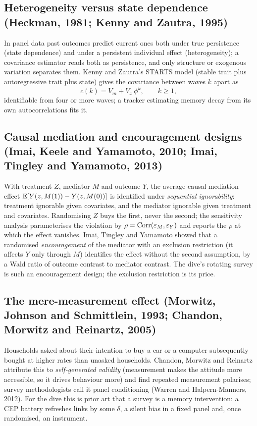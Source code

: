 \subsection{Heterogeneity versus state dependence (Heckman, 1981; Kenny and Zautra, 1995)}

In panel data past outcomes predict current ones both under true persistence (state dependence) and under a persistent individual effect (heterogeneity); a covariance estimator reads both as persistence, and only structure or exogenous variation separates them. Kenny and Zautra's STARTS model (stable trait plus autoregressive trait plus state) gives the covariance between waves $k$ apart as
\begin{equation}
c(k) = V_m + V_x\,\phi^{k}, \qquad k \ge 1,
\label{panel:eq:starts}
\end{equation}
identifiable from four or more waves; a tracker estimating memory decay from its own autocorrelations fits it.

\subsection{Causal mediation and encouragement designs (Imai, Keele and Yamamoto, 2010; Imai, Tingley and Yamamoto, 2013)}

With treatment $Z$, mediator $M$ and outcome $Y$, the average causal mediation effect $\mathbb{E}[Y(z, M(1)) - Y(z, M(0))]$ is identified under \emph{sequential ignorability}: treatment ignorable given covariates, and the mediator ignorable given treatment and covariates. Randomising $Z$ buys the first, never the second; the sensitivity analysis parameterises the violation by $\rho = \operatorname{Corr}(\varepsilon_M, \varepsilon_Y)$ and reports the $\rho$ at which the effect vanishes. Imai, Tingley and Yamamoto showed that a randomised \emph{encouragement} of the mediator with an exclusion restriction (it affects $Y$ only through $M$) identifies the effect without the second assumption, by a Wald ratio of outcome contrast to mediator contrast. The dive's rotating survey is such an encouragement design; the exclusion restriction is its price.

\subsection{The mere-measurement effect (Morwitz, Johnson and Schmittlein, 1993; Chandon, Morwitz and Reinartz, 2005)}

Households asked about their intention to buy a car or a computer subsequently bought at higher rates than unasked households. Chandon, Morwitz and Reinartz attribute this to \emph{self-generated validity} (measurement makes the attitude more accessible, so it drives behaviour more) and find repeated measurement polarises; survey methodologists call it panel conditioning (Warren and Halpern-Manners, 2012). For the dive this is prior art that a survey is a memory intervention: a CEP battery refreshes links by some $\delta$, a silent bias in a fixed panel and, once randomised, an instrument.

